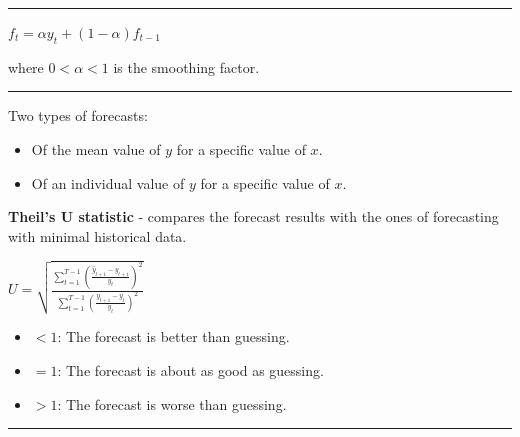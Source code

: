 \columnbreak

\hrule

\begin{f}

\begin{center}
	\(f_{t} = \alpha y_{t} + (1 - \alpha) f_{t - 1}\)
\end{center}

where \(0 < \alpha < 1\) is the smoothing factor.

\end{f}  \hrule

\begin{f}[Forecasts]

Two types of forecasts:

\begin{itemize}[leftmargin=*]
	\item Of the mean value of \(y\) for a specific value of \(x\).
	\item Of an individual value of \(y\) for a specific value of \(x\).
\end{itemize}

\textbf{Theil's U statistic} - compares the forecast results with the ones of forecasting with minimal historical data.

\begin{center}
	\(U = \sqrt{\frac{\sum_{t=1}^{T-1} \left( \frac{\hat{y}_{t+1} - y_{t+1}}{y_t} \right)^2}{\sum_{t=1}^{T-1} \left( \frac{y_ {t+1} - y_t}{y_t} \right)^2}}\)
\end{center}

\begin{itemize}[leftmargin=*]
	\item \(< 1\): The forecast is better than guessing.
	\item \(= 1\): The forecast is about as good as guessing.
	\item \(> 1\): The forecast is worse than guessing.
\end{itemize}



\end{f}  \hrule

